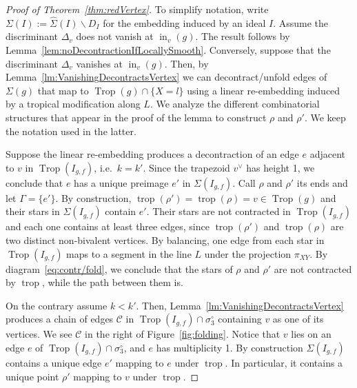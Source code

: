 \documentclass[11pt]{amsart}
\numberwithin{equation}{section}
\theoremstyle{plain}
\theoremstyle{definition}
\theoremstyle{remark}
\begin{document}
\begin{proof}[Proof of Theorem~\ref{thm:redVertex}] 
  To simplify notation, write
  $\Sigma(I):=\widehat{\Sigma}(I)\smallsetminus D_I$ for the embedding
  induced by an ideal $I$.  Assume the discriminant $\Delta_v$ does
  not vanish at $\operatorname{in}_v(g)$. The result follows by
  Lemma~\ref{lem:noDecontractionIfLocallySmooth}.  Conversely, suppose
  that the discriminant $\Delta_v$ vanishes at $\operatorname{in}_v(g)$. Then, by
  Lemma~\ref{lm:VanishingDecontractsVertex} we can decontract/unfold
  edges of $\Sigma(g)$ that map to $\operatorname{Trop}(g)\cap \{X=l\}$ using a
  linear re-embedding induced by a tropical modification along $L$. We
  analyze the different combinatorial structures that appear in the
  proof of the lemma to construct  $\rho$ and $\rho'$. We keep the notation used in the latter.

  Suppose the linear re-embedding produces a decontraction of an edge
  $e$ adjacent to $v$ in $\operatorname{Trop}(I_{g,f})$, i.e.\ $k=k'$. Since the trapezoid
  $v^{\vee}$ has height 1, we conclude that $e$ has a unique preimage $e'$
  in $\Sigma(I_{g,f})$. Call $\rho$ and $\rho'$ its ends and let $\Gamma= \{e'\}$. By
  construction, $\operatorname{trop}(\rho')=\operatorname{trop}(\rho)=v\in \operatorname{Trop}(g)$ and their
  stars in $\Sigma(I_{g,f})$ contain $e'$. Their stars are not
  contracted in $\operatorname{Trop}(I_{g,f})$ and each one contains at least three
  edges, since $\operatorname{trop}(\rho')$ and $\operatorname{trop}(\rho)$ are two distinct
  non-bivalent vertices. By balancing, one edge from each star in
  $\operatorname{Trop}(I_{g,f})$ maps to a segment in the line $L$ under the projection
  $\pi_{XY}$. By diagram~\eqref{eq:contr/fold}, we conclude that the
  stars of $\rho$ and $\rho'$ are not contracted by $\operatorname{trop}$, while the
  path between them is.

  On the contrary assume $k< k'$. Then,
  Lemma~\ref{lm:VanishingDecontractsVertex} produces a chain of edges
  $\mathscr{C}$ in $\operatorname{Trop}(I_{g,f})\cap \sigma_3^{\circ}$ containing
  $v$ as one of its vertices. We see $\mathscr{C}$ in the right of
  Figure~\ref{fig:folding}. Notice that $v$ lies on an edge $e$ of
  $\operatorname{Trop}(I_{g,f})\cap \sigma_3^{\circ}$, and $e$ has multiplicity 1.
  By construction $\Sigma(I_{g,f})$ contains a unique edge $e'$
  mapping to $e$ under $\operatorname{trop}$. In particular, it contains a unique
  point $\rho'$ mapping to $v$ under $\operatorname{trop}$.


\end{proof}
\end{document}
